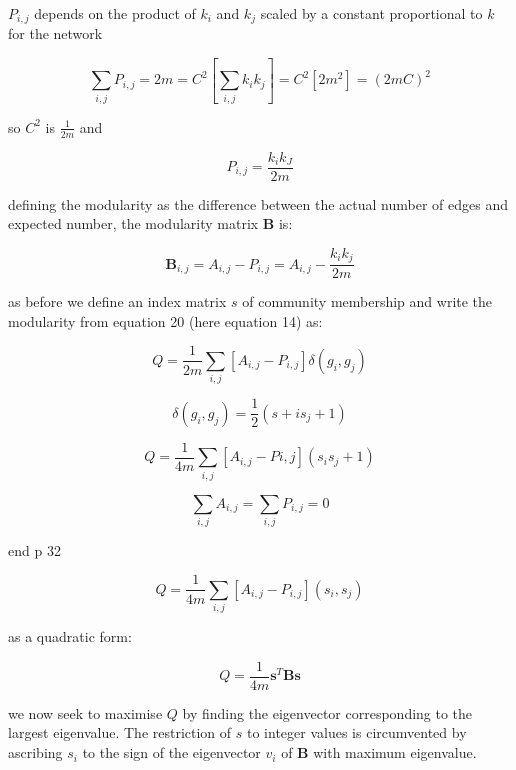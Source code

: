 $P_{i,j}$ depends on the product of $k_i$ and $k_j$ scaled by a constant proportional to $k$ for the network

\begin{equation}
	\sum_{i,j}P_{i,j}=2m=C^2[\sum_{i,j} k_i k_j] = C^2[2m^2]=(2mC)^2
\end{equation} 

so $C^2$ is $\frac{1}{2m}$ and

\begin{equation}
	P_{i,j} = \frac{k_i k_J}{2m}
\end{equation}

defining the modularity as the difference between the actual number of edges and expected number, the modularity matrix $\mathbf{B}$ is:

\begin{equation}
\mathbf{B}_{i,j} = A_{i,j} - P_{i,j} = A_{i,j} - \frac{k_i k_j}{2m}
\end{equation}
\label{eq:modularity matrix B}

as before we define an index matrix $s$ of community membership and write the modularity from equation 20 (here equation 14) as:

\begin{equation}
Q = \frac{1}{2m}\sum_{i,j}[A_{i,j}-P_{i,j}]\delta (g_i,g_j)	
\end{equation}

\begin{equation}
\delta(g_i,g_j)	= \frac{1}{2}(s+i s_j + 1)
\end{equation}

\begin{equation}
	Q = \frac{1}{4m}\sum_{i,j}[A_{i,j}-P{i,j}](s_i s_j + 1)
\end{equation}

\begin{equation}
\sum_{i,j} A_{i,j}=\sum_{i,j}P_{i,j}=0
\end{equation}

end p 32

\begin{equation}
Q = \frac{1}{4m}\sum_{i,j}[A_{i,j}-P_{i,j}](s_i,s_j)	
\end{equation}

as a quadratic form:

\begin{equation}
	Q = \frac{1}{4m}\mathbf{s}^T\mathbf{Bs}
\end{equation}

we now seek to maximise $Q$ by finding the eigenvector corresponding to the largest eigenvalue. The restriction of $s$ to integer values is circumvented by ascribing $s_i$ to the sign of the eigenvector $v_i$
of $\mathbf{B}$ with maximum eigenvalue.

